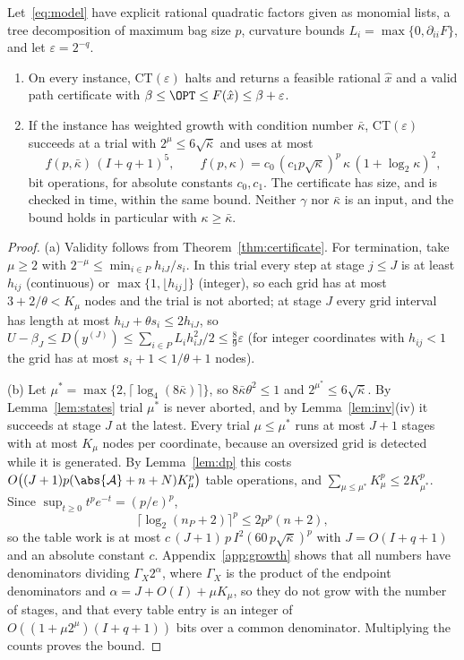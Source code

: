 \begin{theorem}\label{thm:approx}
Let~\eqref{eq:model} have explicit rational quadratic factors given as
monomial lists, a tree decomposition of maximum bag size $p$, curvature bounds
$L_i=\max\{0,\partial_{ii}F\}$, and let $\varepsilon=2^{-q}$.
\begin{enumerate}[label=(\alph*)]
\item On every instance, CT$(\varepsilon)$ halts and returns a feasible
rational $\hat x$ and a valid path certificate with
$\beta\le\OPT\le F(\hat x)\le\beta+\varepsilon$.
\item If the instance has weighted growth with condition number $\bar\kappa$,
CT$(\varepsilon)$ succeeds at a trial with $2^\mu\le6\sqrt{\bar\kappa}$ and uses at
most
\[
f(p,\bar\kappa)\,(I+q+1)^5,\qquad
f(p,\kappa)=c_0\,(c_1p\sqrt\kappa)^p\,\kappa\,(1+\log_2\kappa)^2,
\]
bit operations, for absolute constants $c_0,c_1$. The certificate has size,
and is checked in time, within the same bound. Neither $\gamma$ nor $\bar\kappa$
is an input, and the bound holds in particular with $\kappa\ge\bar\kappa$.
\end{enumerate}
\end{theorem}

\begin{proof}
(a) Validity follows from Theorem~\ref{thm:certificate}. For termination,
take $\mu\ge2$ with $2^{-\mu}\le\min_{i\in P}h_{iJ}/s_i$. In this trial every
step at stage $j\le J$ is at least $h_{ij}$ (continuous) or
$\max\{1,\lfloor h_{ij}\rfloor\}$ (integer), so each grid has at most
$3+2/\theta<K_\mu$ nodes and the trial is not aborted; at stage $J$ every grid
interval has length at most $h_{iJ}+\theta s_i\le2h_{iJ}$, so
$U-\beta_J\le D(y^{(J)})\le\sum_{i\in P}L_ih_{iJ}^2/2\le\frac89\varepsilon$
(for integer coordinates with $h_{ij}<1$ the grid has at most $s_i+1<1/\theta+1$
nodes).

(b) Let $\mu^*=\max\{2,\lceil\log_4(8\bar\kappa)\rceil\}$, so $8\bar\kappa\theta^2\le1$
and $2^{\mu^*}\le6\sqrt{\bar\kappa}$. By Lemma~\ref{lem:states} trial $\mu^*$ is
never aborted, and by Lemma~\ref{lem:inv}(iv) it succeeds at stage $J$ at the
latest. Every trial $\mu\le\mu^*$ runs at most $J+1$ stages with at most $K_\mu$
nodes per coordinate, because an oversized grid is detected while it is
generated. By Lemma~\ref{lem:dp} this costs
$O\bigl((J+1)p(\abs{\mathcal A}+n+N)K_\mu^p\bigr)$ table operations, and
$\sum_{\mu\le\mu^*}K_\mu^p\le2K_{\mu^*}^p$. Since
$\sup_{t\ge0}t^pe^{-t}=(p/e)^p$,
\begin{equation}\label{eq:logabsorb}
\lceil\log_2(n_P+2)\rceil^p\le2p^p(n+2),
\end{equation}
so the table work is at most $c\,(J+1)\,p\,I^2(60\,p\sqrt{\bar\kappa})^p$ with
$J=O(I+q+1)$ and an absolute constant $c$. Appendix~\ref{app:growth} shows that all numbers have
denominators dividing $\Gamma_X2^\alpha$, where $\Gamma_X$ is the product of the
endpoint denominators and $\alpha=J+O(I)+\mu K_\mu$, so they do not grow with
the number of stages, and that every table entry is an integer of
$O((1+\mu2^\mu)(I+q+1))$ bits over a common denominator. Multiplying the counts
proves the bound.
\end{proof}

